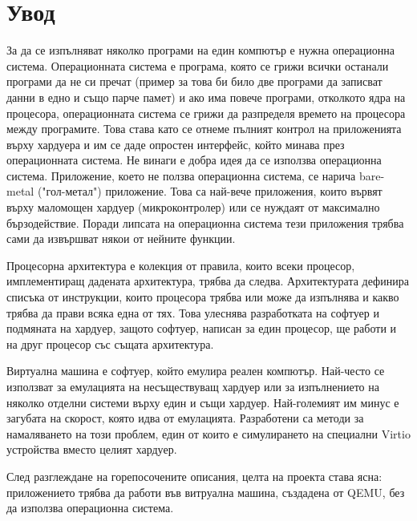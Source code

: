 \chapter*{Увод}



За да се изпълняват няколко програми на един компютър е нужна операционна система. Операционната система е програма, която се грижи всички останали програми да не си пречат (пример за това би било две програми да записват данни в едно и също парче памет) и ако има повече програми, отколкото ядра на процесора, операционната система се грижи да разпределя времето на процесора между програмите. Това става като се отнеме пълният контрол на приложенията върху хардуера и им се даде опростен интерфейс, който минава през операционната система.
Не винаги е добра идея да се използва операционна система. Приложение, което не ползва операционна система, се нарича bare-metal ("гол-метал") приложение. Това са най-вече приложения, които вървят върху маломощен хардуер (микроконтролер) или се нуждаят от максимално бързодействие. Поради липсата на операционна система тези приложения трябва сами да извършват някои от нейните функции.

Процесорна архитектура е колекция от правила, които всеки процесор, имплементиращ дадената архитектура, трябва да следва. Архитектурата дефинира списъка от инструкции, които процесора трябва или може да изпълнява и какво трябва да прави всяка една от тях. Това улеснява разработката на софтуер и подмяната на хардуер, защото софтуер, написан за един процесор, ще работи и на друг процесор със същата архитектура.

Виртуална машина е софтуер, който емулира реален компютър. Най-често се използват за емулацията на несъществуващ хардуер или за изпълнението на няколко отделни системи върху един и същи хардуер. Най-големият им минус е загубата на скорост, която идва от емулацията. Разработени са методи за намаляването на този проблем, един от които е симулирането на специални Virtio устройства вместо целият хардуер.

След разглеждане на горепосочените описания, целта на проекта става ясна: приложението трябва да работи във витруална машина, създадена от QEMU, без да използва операционна система.


